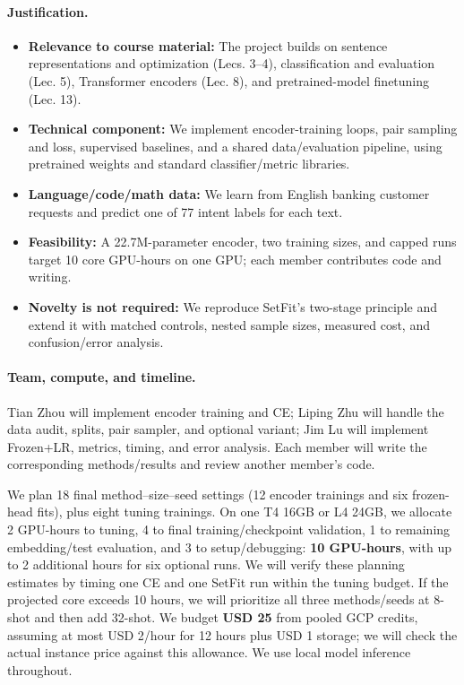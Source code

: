 \documentclass{article}
\begin{document}
\paragraph{Justification.}
\begin{itemize}
\item \textbf{Relevance to course material:} The project builds on sentence representations and optimization (Lecs. 3--4), classification and evaluation (Lec. 5), Transformer encoders (Lec. 8), and pretrained-model finetuning (Lec. 13).
\item \textbf{Technical component:} We implement encoder-training loops, pair sampling and loss, supervised baselines, and a shared data/evaluation pipeline, using pretrained weights and standard classifier/metric libraries.
\item \textbf{Language/code/math data:} We learn from English banking customer requests and predict one of 77 intent labels for each text.
\item \textbf{Feasibility:} A 22.7M-parameter encoder, two training sizes, and capped runs target 10 core GPU-hours on one GPU; each member contributes code and writing.
\item \textbf{Novelty is not required:} We reproduce SetFit's two-stage principle and extend it with matched controls, nested sample sizes, measured cost, and confusion/error analysis.
\end{itemize}

\paragraph{Team, compute, and timeline.}
Tian Zhou will implement encoder training and CE; Liping Zhu will handle the data audit, splits, pair sampler, and optional variant; Jim Lu will implement Frozen+LR, metrics, timing, and error analysis. Each member will write the corresponding methods/results and review another member's code.

We plan 18 final method--size--seed settings (12 encoder trainings and six frozen-head fits), plus eight tuning trainings. On one T4 16GB or L4 24GB, we allocate 2 GPU-hours to tuning, 4 to final training/checkpoint validation, 1 to remaining embedding/test evaluation, and 3 to setup/debugging: \textbf{10 GPU-hours}, with up to 2 additional hours for six optional runs. We will verify these planning estimates by timing one CE and one SetFit run within the tuning budget. If the projected core exceeds 10 hours, we will prioritize all three methods/seeds at 8-shot and then add 32-shot. We budget \textbf{USD 25} from pooled GCP credits, assuming at most USD 2/hour for 12 hours plus USD 1 storage; we will check the actual instance price against this allowance. We use local model inference throughout.
\end{document}
